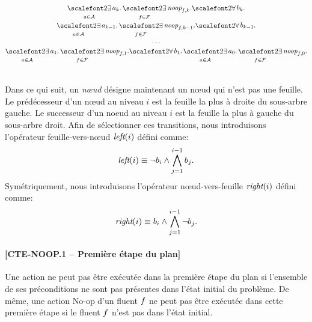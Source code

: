 \begin{small}
\[
\begin{matrix}
\displaystyle \bigexists_{\a \in \A} \a_{\depth}. \bigexists_{\f\in \F} \noop{\f}{\depth}.%
\displaystyle {\bigforall b_{\depth}.}\\
\displaystyle \bigexists_{\a \in \A} \a_{\depth-1}. \bigexists_{\f\in \F} \noop{\f}{\depth-1}.%
\displaystyle {\bigforall b_{\depth-1}.}\\
\displaystyle \dots\\ 
\displaystyle \bigexists_{\a \in \A} \a_{1}. \bigexists_{\f\in \F} \noop{\f}{1}.%
\displaystyle {\bigforall b_{1}.}%
\displaystyle \bigexists_{\a \in \A} \a_{0}. \bigexists_{\f\in \F} \noop{\f}{0}.
\end{matrix}
\]
\end{small}\\

Dans ce qui suit, un \textit{n\oe ud} désigne maintenant un n\oe ud qui n'est pas une feuille. %
Le prédécesseur d'un n\oe ud au niveau $i$ est la feuille la plus à droite du sous-arbre gauche. Le successeur d'un noeud au niveau $i$ est la feuille la plus à gauche du sous-arbre droit.
Afin de sélectionner ces transitions, nous introduisons l'opérateur feuille-vers-n\oe ud $\textit{left}(i)$ défini comme:
\[\textit{left}(i) \equiv \neg b_{i} \wedge \bigwedge\limits_{\substack{j=1}}^{i-1} b_{j}.\]
Symétriquement, nous introduisons l'opérateur n\oe ud-vers-feuille $\textit{right}(i)$ défini comme:
\[\textit{right}(i) \equiv b_{i} \wedge \bigwedge\limits_{\substack{j=1}}^{i-1} \neg b_{j}.\]


\paragraph*{[CTE-NOOP.1 -- Première étape du plan]}

Une action ne peut pas être exécutée dans la première étape du plan si l'ensemble de ses préconditions ne sont pas présentes dans l'état initial du problème. De même, une action No-op d'un fluent $f$ ne peut pas être exécutée dans cette première étape si le fluent $f$ n'est pas dans l'état initial.

